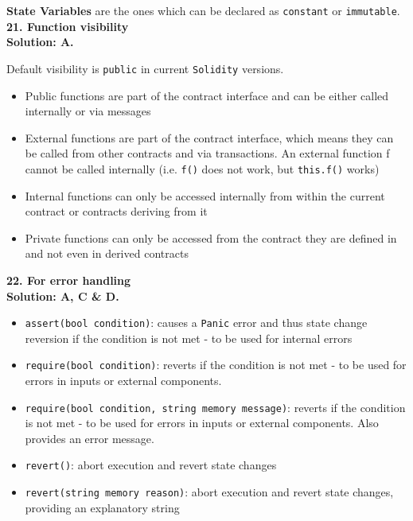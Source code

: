 \textbf{State Variables} are the ones which can be declared as \verb|constant| or \verb|immutable|.\\

\textbf{21. Function visibility}\label{sec:exam2_q21}\\

\textbf{Solution: A.}

Default visibility is \verb|public| in current \verb|Solidity| versions.

\begin{itemize}
    \item Public functions are part of the contract interface and can be either called internally or via messages
    \item External functions are part of the contract interface, which means they can be called from other contracts and via transactions.
        An external function f cannot be called internally (i.e. \verb|f()| does not work, but \verb|this.f()| works)
    \item Internal functions can only be accessed internally from within the current contract or contracts deriving from it
    \item Private functions can only be accessed from the contract they are defined in and not even in derived contracts
\end{itemize}

\textbf{22. For error handling}\label{sec:exam2_q22}\\

\textbf{Solution: A, C \& D.}

\begin{itemize}
    \item\verb|assert(bool condition)|: causes a \verb|Panic| error and thus state change reversion if the condition is not met - to be used for internal errors
    \item\verb|require(bool condition)|: reverts if the condition is not met - to be used for errors in inputs or external components.
    \item\verb|require(bool condition, string memory message)|: reverts if the condition is not met - to be used for errors in inputs or external components.
        Also provides an error message.
    \item\verb|revert()|: abort execution and revert state changes
    \item\verb|revert(string memory reason)|: abort execution and revert state changes, providing an explanatory string
\end{itemize}

